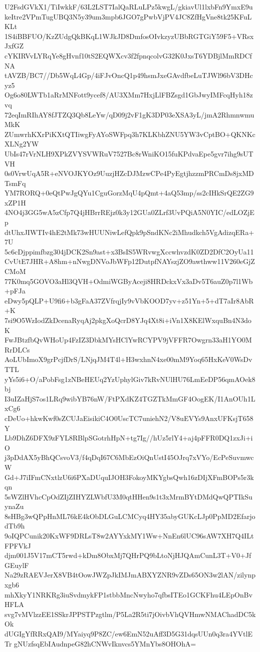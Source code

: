 U2FsdGVkX1/TiIwkkF/63L2LST7IalQaRLuLPz5kwgL/gkiavUl1lxbFn9YmxE9u
keItre2VPmTugUBQ3N5y39um3mpb6JGO7gPwbVjPV4JC8ZfHgVne8tk25KFuLKLt
1S4iBBFUO/KzZUdgQkBKqL1WJkJD8DmfosOIvkzyzUBbRGTGiY59F5+VRsxJxfGZ
cYKIRVvLYRqYe8gHvnf10tS2EQWXcv3f2fpnqcolvG32K0JxsT6YDBjlMmRDCfNA
tAVZB/BC7//Db5WqL4Gp/4iFJvOncQ1p49hsmJxeGAvdfbeLuTJWl96bV3DHcyz5
Og6o80LWTb1aRrMNFott9ycef8/AU3XMm7HxjLlFBZsgd1GbJwyIMFcqHyh18zvq
72eqImRIhAY8fJTZQ3Qb8LeYw/qD09j2vF1gK3DP03eXSA3yL/jmA2RhmnwmuMkK
ZUmwrhKXrPiKXtQTIiwgFyAYoSWFpq3h7KLKbhZNU5YW3vCptBO+QKNKcXLNg2YW
UbIs47rVrNLH9XPkZVYSVWRuV7527Bc8rWniKO15fuKPdvaEpe5gvr7ihg9sUTVH
0s0VrwUqA5R+eNVOJKYOz9UuzjHZcDJMzwCPe4PyEgtjhzzmPRCmDs8jxMDTsmFq
YM7RORQ+0eQtPwJgQYu1CguGorzMqU4pQmt+4aQ53mp/ss2cIHkSrQE2ZG9xZP1H
4NO4j3GG5wA5zCfp7Q4jHBrrREjz0k3y12GUa0ZLrf3UvPQiA5N0YIC/edLOZjEp
dtUhxJIWTIv4hE2tMk73wHUUNiwLefQpk9pSndKNc2iMhudkch5VgAdizqERa+7U
5c6cDjppimfbzg304jDCK2Sn9ast+x3BsIS5WRvwgXccwhvzdK0ZD2DfC2OyUa11
CvUtE7JHR+A8hm+nNwgDNVoJbWFp12DutpfNAYszjZO9awthww11V260eGjZCMoM
77K0mq5GOVO3aHl3QVH+OdmiWGByAceji8HRDckxVx3aDv5T6auZ0p7l1Wb+pFJa
eDwy5pQLP+U9fi6+b3gFaA37ZVfrqjIy9vVbKOOD7yv+z51Yn+5+dT7aIr8AbR+K
7si9O5WzIodZkDcenaRyqAj2pkgXoQcrD8YJq4Xt8i+iVn1X8KElWxquBn4N3doK
FwJBtzfbQvWHoUp4FzIZ3DbkMYsHClYwRCYPV9jVFFR7Owgrn33aH1YO0MRrDLCs
AoLUbImoX9grPcjfDrS/LNjqJM4T4l+H3wxhnN4xe00mM9Yoq65HxKeV0WsDvTTL
yYs5i6+O/aPobFsg1zNBeHEUq2YzUphylGiv7kRvNUlHU76LmEeDP56qmAOek8bj
I3uIZaHjS7os1LRq9wibYB76nW/FtPXdKZ4TGZTkMmGF4OogEK/I1AnOUh1LxCg6
cDeUo+hkwKwf0sZCUJaEisikiC4O0UscTC7uniehN2/V8uEVYs9AnxUFKsjT658Y
Lb9DhZ6DFX9zFYL8RBlpSGotrhHpN+tg7Ig//hUz5rlY4+aj4pFFR0DQ1zxJi+iO
j3pDdAX5yBhQCsvoV3/f4qDqI67C6MbEzOiQnUstI45OJrq7xVYo/EcPeSuvmwcW
Gd+J7iIFmCNxtlzU6i6PXaDUquIJOH3FokoyMKYgbsQwh16zDIjXFmBOPs5r3kqn
5sWZlHVhcCpOdZIjZIHYZLWbfU3M0qtHHen9s1t3xMrmBYtDMdQwQPTIkSuynaZu
8sHBg3wQPpHnML76kE4kObDLGuLCMCyq4HY35abyGUKcLJp0PpMD2EfarjodTb9h
9oIQPCunik20KxWF9DRLsT8w2AYYxkMY1Ww+NnEn6lUC96sAW7XH7Q4ILtFPFVkJ
djm001J5V17mCT5rwd+kDm8ObxMj7QHrPQ9bLtoNjHJQAmCunL3T+V0+JfGEuylF
Na29zRAEVJerX8VB4tOowJWZpJkIMJmABXYZNR9vZDs65ON3w2lAN/zilynpxgb6
mhXkyY1NRKRg3iuSvdmykFP1stbbMncNwyho7qfbsITEo1GCKFhu4LEpOnBvHFLA
svg7vMVlzzEE1SSkrJPPSTPzgtlm/P5La2R5ti7jOivbVhQVHmwNMAChadDC5kOk
dUGIgYfRRxQAI9/MYaiyq9P8ZC/ew6EmN52uAff3D5G31dqsUUn0q3ra4YVtlETr
gNUzfsqEbIAudnpeG82hCNWvIknvcs5YMnYbs8OHOhA=
